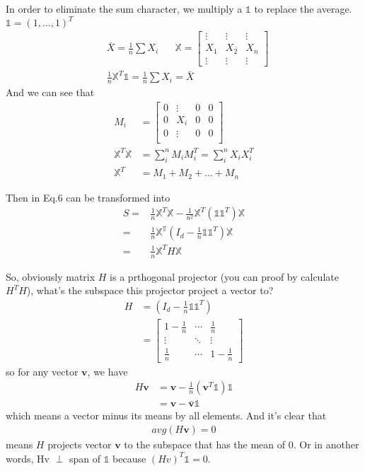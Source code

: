\documentclass[11pt]{article}
\begin{document}
In order to eliminate the sum character, we multiply a $\mathbb{1}$ to replace the average. $\mathbb{1}=(1,\dots,1)^T$
\begin{align}
  &\bar{X} = \frac{1}{n}\sum X_i \;\;\;\;\;\;
  \mathbb{X} =
  \begin{bmatrix}
    \vdots&\vdots&\vdots\\
    X_1&X_2&X_n\\
    \vdots&\vdots&\vdots
  \end{bmatrix}\\
  &\frac{1}{n}\mathbb{X}^T\mathbb{1}=\frac{1}{n}\sum X_i = \bar{X}
\end{align}
And we can see that
\begin{align}
  M_i &=
  \begin{bmatrix}
    0&\vdots & 0& 0\\
    0&X_i &0&0\\
    0&\vdots&0&0\\
  \end{bmatrix}\\
  \mathbb{X}^T \mathbb{X} &= \sum_i^n M_iM_i^T = \sum_i^nX_iX_i^T\\
  \mathbb{X}^T &= M_1 + M_2 + \dots + M_n
\end{align}

Then in Eq.6 can be transformed into
\begin{align}
  S = & \frac{1}{n}\mathbb{X}^T\mathbb{X} - \frac{1}{n^2}\mathbb{X}^T(\mathbb{1}\mathbb{1}^T)\mathbb{X}\\
  = & \frac{1}{n}\mathbb{X^T}(I_d - \frac{1}{n}\mathbb{1}\mathbb{1}^T)\mathbb{X}\\
  = & \frac{1}{n}\mathbb{X}^TH\mathbb{X}
\end{align}

So, obviously matrix $H$ is a prthogonal projector (you can proof by calculate $H^TH$), what's the subspace this projector project a vector to?
\begin{align}
  H & = (I_d - \frac{1}{n}\mathbb{1}\mathbb{1}^T)\\
& = \begin{bmatrix}
  1-\frac{1}{n} & \cdots & \frac{1}{n}\\
  \vdots & \ddots & \vdots\\
  \frac{1}{n} & \cdots & 1-\frac{1}{n}  
\end{bmatrix} 
\end{align}
so for any vector $\bm{v}$, we have
\begin{align}
  H\bm{v} & = \bm{v} - \frac{1}{n}(\bm{v}^T\mathbb{1})\mathbb{1}\\
    & = \bm{v} - \bar{\bm{v}}\mathbb{1}
\end{align}
which means a vector minus its means by all elements. And it's clear that
\begin{align}
  avg(H\bm{v}) = 0
\end{align}
means $H$ projects vector $\bm{v}$ to the subspace that has the mean of 0. Or in another words, Hv $\perp$ span of $\mathbb{1}$ because $(Hv)^T\mathbb{1} = 0$.
\end{document}
